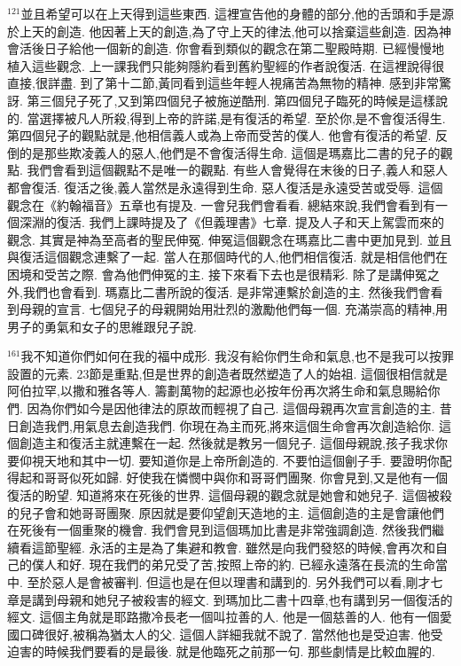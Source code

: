 \documentclass{book}
\begin{document}
$^{121}$並且希望可以在上天得到這些東西.
這裡宣告他的身體的部分,他的舌頭和手是源於上天的創造.
他因著上天的創造,為了守上天的律法,他可以捨棄這些創造.
因為神會活後日子給他一個新的創造.
你會看到類似的觀念在第二聖殿時期.
已經慢慢地植入這些觀念.
上一課我們只能夠隱約看到舊約聖經的作者說復活.
在這裡說得很直接,很詳盡.
到了第十二節,黃同看到這些年輕人視痛苦為無物的精神.
感到非常驚訝.
第三個兒子死了,又到第四個兒子被施逆酷刑.
第四個兒子臨死的時候是這樣說的.
當選擇被凡人所殺,得到上帝的許諾,是有復活的希望.
至於你,是不會復活得生.
第四個兒子的觀點就是,他相信義人或為上帝而受苦的僕人.
他會有復活的希望.
反倒的是那些欺凌義人的惡人,他們是不會復活得生命.
這個是瑪嘉比二書的兒子的觀點.
我們會看到這個觀點不是唯一的觀點.
有些人會覺得在末後的日子,義人和惡人都會復活.
復活之後,義人當然是永遠得到生命.
惡人復活是永遠受苦或受辱.
這個觀念在《約翰福音》五章也有提及.
一會兒我們會看看.
總結來說,我們會看到有一個深淵的復活.
我們上課時提及了《但義理書》七章.
提及人子和天上駕雲而來的觀念.
其實是神為至高者的聖民伸冤.
伸冤這個觀念在瑪嘉比二書中更加見到.
並且與復活這個觀念連繫了一起.
當人在那個時代的人,他們相信復活.
就是相信他們在困境和受苦之際.
會為他們伸冤的主.
接下來看下去也是很精彩.
除了是講伸冤之外,我們也會看到.
瑪嘉比二書所說的復活.
是非常連繫於創造的主.
然後我們會看到母親的宣言.
七個兒子的母親開始用壯烈的激勵他們每一個.
充滿崇高的精神,用男子的勇氣和女子的思維跟兒子說.

$^{161}$我不知道你們如何在我的福中成形.
我沒有給你們生命和氣息,也不是我可以按罪設置的元素.
23節是重點,但是世界的創造者既然塑造了人的始祖.
這個很相信就是阿伯拉罕,以撒和雅各等人.
籌劃萬物的起源也必按年份再次將生命和氣息賜給你們.
因為你們如今是因他律法的原故而輕視了自己.
這個母親再次宣言創造的主.
昔日創造我們,用氣息去創造我們.
你現在為主而死,將來這個生命會再次創造給你.
這個創造主和復活主就連繫在一起.
然後就是教另一個兒子.
這個母親說,孩子我求你要仰視天地和其中一切.
要知道你是上帝所創造的.
不要怕這個劊子手.
要證明你配得起和哥哥似死如歸.
好使我在憐憫中與你和哥哥們團聚.
你會見到,又是他有一個復活的盼望.
知道將來在死後的世界.
這個母親的觀念就是她會和她兒子.
這個被殺的兒子會和她哥哥團聚.
原因就是要仰望創天造地的主.
這個創造的主是會讓他們在死後有一個重聚的機會.
我們會見到這個瑪加比書是非常強調創造.
然後我們繼續看這節聖經.
永活的主是為了集避和教會.
雖然是向我們發怒的時候,會再次和自己的僕人和好.
現在我們的弟兄受了苦,按照上帝的約.
已經永遠落在長流的生命當中.
至於惡人是會被審判.
但這也是在但以理書和講到的.
另外我們可以看,剛才七章是講到母親和她兒子被殺害的經文.
到瑪加比二書十四章,也有講到另一個復活的經文.
這個主角就是耶路撒冷長老一個叫拉善的人.
他是一個慈善的人.
他有一個愛國口碑很好,被稱為猶太人的父.
這個人詳細我就不說了.
當然他也是受迫害.
他受迫害的時候我們要看的是最後.
就是他臨死之前那一句.
那些劇情是比較血腥的.
\end{document}
